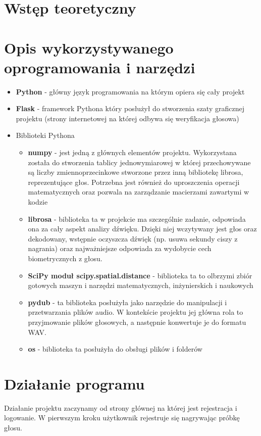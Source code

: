 \section{Wstęp teoretyczny}



\section{Opis wykorzystywanego oprogramowania i narzędzi}
\begin{itemize}
	\item \textbf{Python} - główny język programowania na którym opiera się cały projekt
	\item \textbf{Flask} - framework Pythona który posłużył do stworzenia szaty graficznej projektu (strony internetowej na której odbywa się weryfikacja głosowa)
	\item Biblioteki Pythona
	\begin{itemize}
		\item \textbf{numpy} - jest jedną z głównych elementów projektu. Wykorzystana została do stworzenia tablicy jednowymiarowej w której przechowywane są liczby zmiennoprzecinkowe stworzone przez inną bibliotekę librosa, reprezentujące głos. Potrzebna jest również do uproszczenia operacji matematycznych oraz pozwala na zarządzanie macierzami zawartymi w kodzie
		\item \textbf{librosa} - biblioteka ta w projekcie ma szczególnie zadanie, odpowiada ona za cały aspekt analizy dźwięku. Dzięki niej wczytywany jest głos oraz dekodowany, wstępnie oczyszcza dźwięk (np. usuwa sekundy ciszy z nagrania) oraz najważniejsze odpowiada za wydobycie cech biometrycznych z głosu.
		\item \textbf{SciPy  moduł scipy.spatial.distance} - biblioteka ta to olbrzymi zbiór gotowych maszyn i narzędzi matematycznych, inżynierskich i naukowych
		\item \textbf{pydub} - ta biblioteka posłużyła jako narzędzie do manipulacji i przetwarzania plików audio. W kontekście projektu jej główna rola to przyjmowanie plików głosowych, a następnie konwertuje je do formatu WAV. 
		\item \textbf{os} - biblioteka ta posłużyła do obsługi plików i folderów
		
	\end{itemize}	
\end{itemize}	



\section{Działanie programu}
Działanie projektu zaczynamy od strony głównej na której jest rejestracja i logowanie. W pierwszym kroku użytkownik rejestruje się nagrywając próbkę głosu. 

